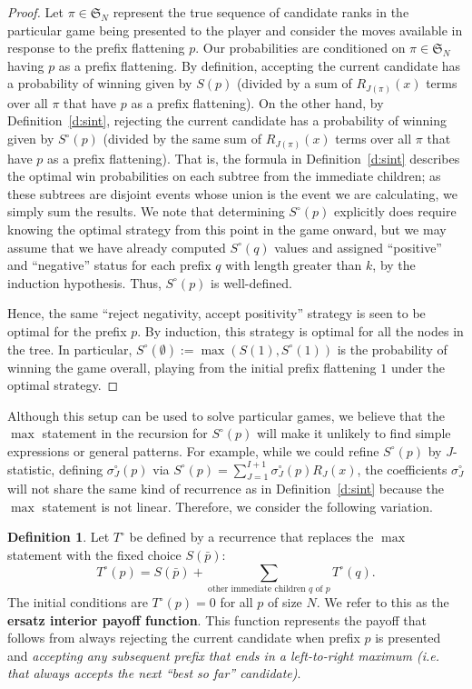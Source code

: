 \documentclass[11pt]{amsart}   %
\theoremstyle{definition}
\newtheorem{definition}[theorem]{Definition}
\theoremstyle{remark}
\numberwithin{equation}{section}
\theoremstyle{theorem}
\newcommand{\SN}{\mathfrak{S}}
\begin{document}
\begin{proof}
Let $\pi \in \SN_N$ represent the true sequence of candidate ranks in the
particular game being presented to the player and consider the moves available
in response to the prefix flattening $p$.  Our probabilities are conditioned on
$\pi \in \SN_N$ having $p$ as a prefix flattening.  By definition, accepting
the current candidate has a probability of winning given by $S(p)$ (divided by
a sum of $R_{J(\pi)}(x)$ terms over all $\pi$ that have $p$ as a prefix
flattening).  On the other hand, by Definition~\ref{d:sint}, rejecting the
current candidate has a probability of winning given by $S^\circ(p)$ (divided
by the same sum of $R_{J(\pi)}(x)$ terms over all $\pi$ that have $p$ as a
prefix flattening).  That is, the formula in Definition~\ref{d:sint} describes
the optimal win probabilities on each subtree from the immediate children; as
these subtrees are disjoint events whose union is the event we are calculating,
we simply sum the results.  We note that determining $S^\circ(p)$ explicitly
does require knowing the optimal strategy from this point in the game onward,
but we may assume that we have already computed $S^\circ(q)$ values and
assigned ``positive'' and ``negative'' status for each prefix $q$ with length
greater than $k$, by the induction hypothesis.  Thus, $S^\circ(p)$ is
well-defined.

Hence, the same ``reject negativity, accept positivity'' strategy is seen to be
optimal for the prefix $p$.  By induction, this strategy is optimal for all the
nodes in the tree.  In particular, $S^\circ(\emptyset) := \max(S(1),
S^\circ(1))$ is the probability of winning the game overall, playing from the
initial prefix flattening $1$ under the optimal strategy.
\end{proof}

Although this setup can be used to solve particular games, we believe that the
$\max$ statement in the recursion for $S^\circ(p)$ will make it unlikely to
find simple expressions or general patterns.  For example, while we could
refine $S^\circ(p)$ by $J$-statistic, defining $\sigma^\circ_J(p)$ via
$S^\circ(p) = \sum_{J=1}^{I+1} \sigma^\circ_J(p) R_J(x)$,
the coefficients $\sigma^\circ_J$ will not share the same kind of
recurrence as in Definition~\ref{d:sint} because the $\max$ statement is not
linear.  Therefore, we consider the following variation.

\begin{definition}\label{d:tc}
Let $T^\circ$ be defined by a recurrence that replaces the $\max$ statement
with the fixed choice $S(\bar p)$:
\begin{equation}\label{e:tc}
 T^\circ(p) = S(\bar p) + \sum\limits_{\text{other immediate children $q$ of $p$}} T^\circ(q). 
\end{equation}
The initial conditions are $T^\circ(p) = 0$ for all $p$ of size $N$.
We refer to this as the {\bf ersatz interior payoff function}.
This function represents the payoff that follows from always rejecting the
current candidate when prefix $p$ is presented and {\em accepting any
subsequent prefix that ends in a left-to-right maximum (i.e. that always
accepts the next ``best so far'' candidate)}.  
\end{definition}
\end{document}

